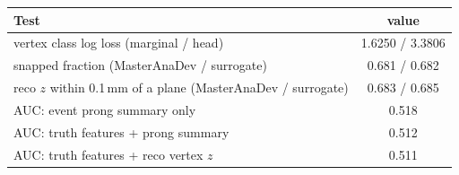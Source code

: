 \begin{tabular}{lc}
\toprule
Test & value \\
\midrule
vertex class log loss (marginal / head) & 1.6250 / 3.3806 \\
snapped fraction (MasterAnaDev / surrogate) & 0.681 / 0.682 \\
reco $z$ within 0.1\,mm of a plane (MasterAnaDev / surrogate) & 0.683 / 0.685 \\
\midrule
AUC: event prong summary only & 0.518 \\
AUC: truth features + prong summary & 0.512 \\
AUC: truth features + reco vertex $z$ & 0.511 \\
\bottomrule
\end{tabular}
